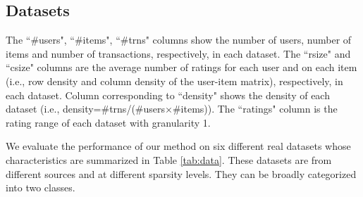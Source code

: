 \documentclass[letterpaper]{article}
\begin{document}
\subsection{Datasets}
\begin{table}[ht]
\caption{The datasets used in evaluation}
\label{tab:data}
\begin{center}
\tiny
{}
   \begin{tablenotes}
      \tiny
      \item The ``\#users", ``\#items", ``\#trns" columns show the number of users, number of items and number of transactions, respectively, in each dataset. The ``rsize" and ``csize" columns are the average number of ratings for each user and on each item (i.e., row density and column density of the user-item matrix), respectively, in each dataset. Column corresponding to ``density" shows the density of each dataset (i.e., density=\#trns/(\#users$\times$\#items)). The ``ratings" column is the rating range of each dataset with granularity 1.
    \end{tablenotes}
\end{center}
\end{table}
We evaluate the performance of our method on six different real datasets whose characteristics are summarized in Table \ref{tab:data}. These datasets are from different sources and at different sparsity levels. They can be broadly categorized into two classes.
\end{document}

